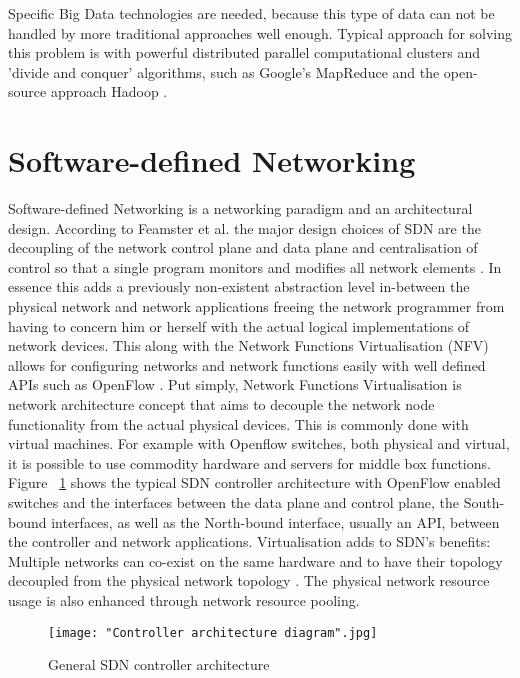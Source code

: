 \documentclass{acm_proc_article-sp}
\begin{document}
Specific Big Data technologies are needed, because this type of data can not be handled by more traditional approaches well enough. Typical approach for solving this problem is with powerful distributed parallel computational clusters and 'divide and conquer' algorithms, such as Google's MapReduce \cite{Dean:2008:MSD:1327452.1327492} and the open-source approach Hadoop \cite{Hadoop}.

\section{Software-defined Networking}

Software-defined Networking is a networking paradigm and an architectural design. According to Feamster et al. the major design choices of SDN are the decoupling of the network control plane and data plane and centralisation of control so that a single program monitors and modifies all network elements \cite{Feamster:2013:RS:2559899.2560327}. In essence this adds a previously non-existent abstraction level in-between the physical network and network applications freeing the network programmer from having to concern him or herself with the actual logical implementations of network devices. This along with the Network Functions Virtualisation (NFV) allows for configuring networks and network functions easily with well defined APIs such as OpenFlow \cite{McKeown-CCR2008}. Put simply, Network Functions Virtualisation is network architecture concept that aims to decouple the network node functionality from the actual physical devices. This is commonly done with virtual machines. For example with Openflow switches, both physical and virtual, it is possible to use commodity hardware and servers for middle box functions. Figure ~\ref{fig:architecture} shows the typical SDN controller architecture with OpenFlow enabled switches and the interfaces between the data plane and control plane, the South-bound interfaces, as well as the North-bound interface, usually an API, between the controller and network applications. Virtualisation adds to SDN's benefits: Multiple networks can co-exist on the same hardware and to have their topology decoupled from the physical network topology \cite{Azodolmolky}. The physical network resource usage is also enhanced through network resource pooling. 

\begin{figure}[ht!]
\centering
{}
\texttt{[image: "Controller architecture diagram".jpg]}
\caption{General SDN controller architecture}
\label{fig:architecture}
\end{figure} 
\end{document}
